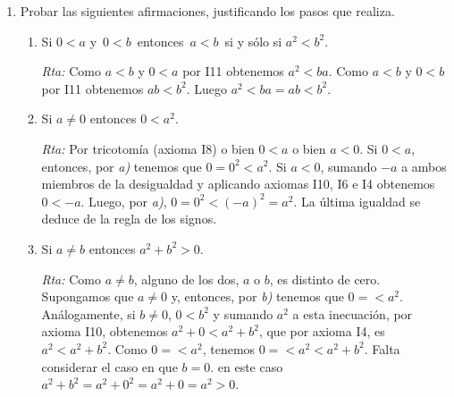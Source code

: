\documentclass[a4paper,12pt,twoside,spanish,reqno]{amsbook}
\numberwithin{equation}{section}
\newcommand{\rta}{\noindent\textit{Rta: }}
\begin{document}
\begin{enumerate}
\begin{enumerate}
            \rta Como $0<a\,$ y $\,0<b\,$, por axioma I11, $0 \cdot b < a \cdot b$. Por un resultado del teórico  tenemos que $0 \cdot b = 0$, luego $0 < a\cdot b$.
            
            \item $a<b\,$ y $\,c<0$ implican $\,b\cdot c<a\cdot c$
            
            \rta Sumamos $-c$  a la inecuación  $\,c<0$ y  obtenemos, por axioma I10,    $-c + c<-c + 0$, luego por axioma I6 en la parte izquierda y axioma I4 en la parte derecha, obtenemos $0 < -c$: Ahora bien  por axioma I11, $a<b\,$ y  $0 < -c$ implican $a \cdot (-c)<b \cdot (-c)$. Por la regla de los signos tenemos $-a \cdot c<- b \cdot c$. Sumando $a \cdot c$ y $ b \cdot c$  a ambos lados de la inecuación y aplicando axioma I10 y  repetidamente los axiomas I4 e I6, obtenemos  $\,b\cdot c<a\cdot c$.
        \end{enumerate}
        
        \item  Probar las siguientes afirmaciones, justificando los pasos que realiza.
        \begin{enumerate}
            \item Si $0 < a$  y $\,0<b\,$ entonces $\,a<b\,$ si y sólo si $a^2<b^2$.
            
            \rta  Como $a < b$ y $0 < a$ por I11 obtenemos $a^2 < ba$. Como $a < b$ y $0 < b$ por I11 obtenemos $ab < b^2$. Luego  $a^2 < ba = ab < b^2$.
            
            
            \item Si $a\neq 0$  entonces $0 < a^2$.
            
            \rta  Por tricotomía (axioma I8) o bien $0 <a$ o bien $a <0$. Si $0<a$, entonces, por \textit{a)} tenemos que $0 = 0^2 < a^2$.  Si $a<0$, sumando $-a$ a ambos miembros de la desigualdad y aplicando axiomas I10, I6 e I4 obtenemos $0 < -a$. Luego, por \textit{a)},  $0 = 0^2 < (-a)^2 = a^2$. La última igualdad se deduce de la regla de los signos. 
            
            \item Si $a\neq b$  entonces $a^2+b^2>0$.
            
            \rta Como $a\neq b$,  alguno de los dos, $a$ o $b$, es distinto de cero. Supongamos que $a \ne 0$ y, entonces, por  \textit{b)} tenemos que $0 = < a^2$. Análogamente, si $b \ne 0$, $0 < b^2$ y sumando  $a^2$  a esta inecuación, por axioma I10, obtenemos $a^2 + 0 <a^2 + b^2$, que por axioma I4, es $a^2  <a^2 + b^2$. Como $0 = < a^2$, tenemos $0 = < a^2 < a^2 + b^2$. Falta considerar el caso en que  $b =0$. en este caso $a^2 + b^2 = a^2 + 0^2 = a^2 + 0 = a^2 > 0$.
            

\end{enumerate}
\end{enumerate}
\end{document}
